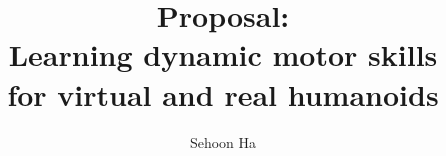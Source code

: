 \documentclass[12pt]{gatech-thesis}
\title{Proposal: \protect\\ Learning dynamic motor skills \protect\\ for virtual and real humanoids} %
\author{Sehoon Ha}
\begin{document}


\begin{preliminary}
\contents



\end{preliminary}







\end{document}
